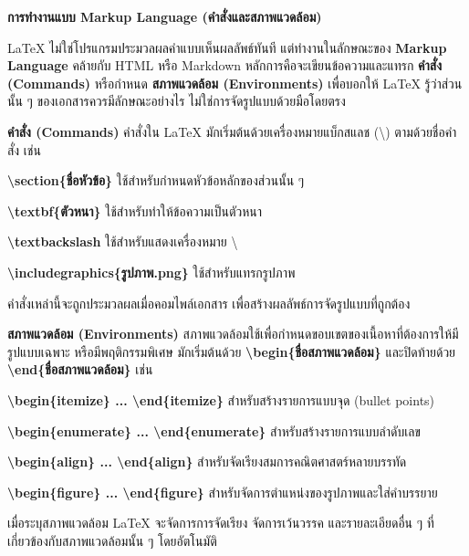 \hspace*{1.5em} %
\textbf{การทำงานแบบ Markup Language (คำสั่งและสภาพแวดล้อม)}

\hspace*{1.5em} %
LaTeX ไม่ใช่โปรแกรมประมวลผลคำแบบเห็นผลลัพธ์ทันที แต่ทำงานในลักษณะของ \textbf{Markup Language} คล้ายกับ HTML หรือ Markdown หลักการคือจะเขียนข้อความและแทรก \textbf{คำสั่ง (Commands)} หรือกำหนด \textbf{สภาพแวดล้อม (Environments)} เพื่อบอกให้ LaTeX รู้ว่าส่วนนั้น ๆ ของเอกสารควรมีลักษณะอย่างไร ไม่ใช่การจัดรูปแบบด้วยมือโดยตรง

\begin{mycustomitem}
    \item \textbf{คำสั่ง (Commands)} คำสั่งใน LaTeX มักเริ่มต้นด้วยเครื่องหมายแบ็กสแลช (\textbackslash) ตามด้วยชื่อคำสั่ง เช่น
    \begin{mycustomitem}
        \item \textbf{\textbackslash section\{ชื่อหัวข้อ\}} ใช้สำหรับกำหนดหัวข้อหลักของส่วนนั้น ๆ
        \item \textbf{\textbackslash textbf\{ตัวหนา\}} ใช้สำหรับทำให้ข้อความเป็นตัวหนา
        \item \textbf{\textbackslash textbackslash} ใช้สำหรับแสดงเครื่องหมาย \textbackslash
        \item \textbf{\textbackslash includegraphics\{รูปภาพ.png\}} ใช้สำหรับแทรกรูปภาพ
    \end{mycustomitem}

คำสั่งเหล่านี้จะถูกประมวลผลเมื่อคอมไพล์เอกสาร เพื่อสร้างผลลัพธ์การจัดรูปแบบที่ถูกต้อง

    \item \textbf{สภาพแวดล้อม (Environments)} สภาพแวดล้อมใช้เพื่อกำหนดขอบเขตของเนื้อหาที่ต้องการให้มีรูปแบบเฉพาะ หรือมีพฤติกรรมพิเศษ มักเริ่มต้นด้วย \textbf{\textbackslash begin\{ชื่อสภาพแวดล้อม\}} และปิดท้ายด้วย \textbf{\textbackslash end\{ชื่อสภาพแวดล้อม\}} เช่น
    \begin{mycustomitem}
        \item \textbf{\textbackslash begin\{itemize\} ... \textbackslash end\{itemize\}} สำหรับสร้างรายการแบบจุด (bullet points)
        \item \textbf{\textbackslash begin\{enumerate\} ... \textbackslash end\{enumerate\}} สำหรับสร้างรายการแบบลำดับเลข
        \item \textbf{\textbackslash begin\{align\} ... \textbackslash end\{align\}} สำหรับจัดเรียงสมการคณิตศาสตร์หลายบรรทัด
        \item \textbf{\textbackslash begin\{figure\} ... \textbackslash end\{figure\}} สำหรับจัดการตำแหน่งของรูปภาพและใส่คำบรรยาย
    \end{mycustomitem}
    
เมื่อระบุสภาพแวดล้อม LaTeX จะจัดการการจัดเรียง จัดการเว้นวรรค และรายละเอียดอื่น ๆ ที่เกี่ยวข้องกับสภาพแวดล้อมนั้น ๆ โดยอัตโนมัติ

\end{mycustomitem}

